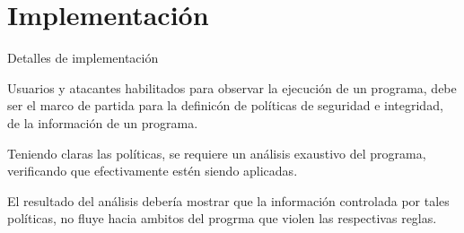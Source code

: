 \label{ch:implementacion}
\chapter{Implementación}

Detalles de implementación \newline

Usuarios y atacantes habilitados para observar la ejecución de un programa,
debe ser el marco de partida para la definicón de políticas de seguridad e
integridad, de la información de un programa.\newline

Teniendo claras las políticas, se requiere un análisis exaustivo del
programa, verificando que efectivamente estén siendo aplicadas.\newline

El resultado del análisis debería mostrar que la información controlada por
tales políticas, no fluye hacia ambitos del progrma que violen las respectivas
reglas.\newline
